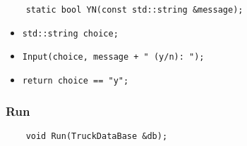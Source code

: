 \begin{lstlisting}
	static bool YN(const std::string &message);
\end{lstlisting}

\begin{itemize}
	\item \verb|std::string choice;|
	\item \verb|Input(choice, message + " (y/n): ");|
	\item \verb|return choice == "y";|
\end{itemize}


\subsubsection*{Run}

\begin{lstlisting}
	void Run(TruckDataBase &db);
\end{lstlisting}

